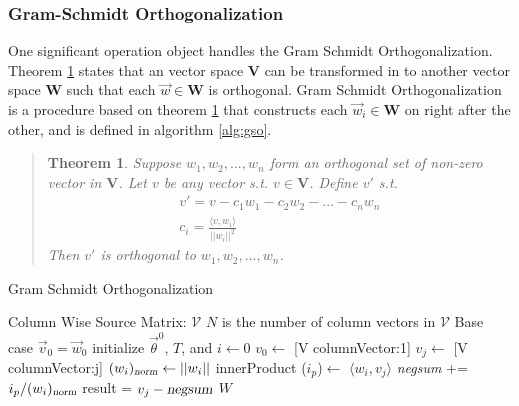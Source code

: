 \documentclass[12pt ]{article}
\newtheorem{thm}{Theorem}[section]
\begin{document}
\subsubsection{Gram-Schmidt Orthogonalization}
One significant operation object handles the Gram Schmidt Orthogonalization.  
Theorem \ref{gso-theorem} states that an vector space $\mathbf{V}$ can be transformed in to another vector space $\mathbf{W}$ such that each $\vec{w}\in \mathbf{W}$ is orthogonal.  Gram Schmidt Orthogonalization is a procedure based on theorem \ref{gso-theorem} that constructs each $\vec{w}_i \in \mathbf{W}$ on right after the other, and is defined in algorithm \ref{alg:gso}.

\begin{quote}
\begin{thm} 
\label{gso-theorem}
Suppose $w_1, w_2, ..., w_n$ form an orthogonal set of non-zero vector in $\mathbf{V}$.  Let $v$ be any vector s.t. $v \in \mathbf{V}$.  Define $v'$ s.t. 
\begin{eqnarray}
v' = v - c_1 w_1 - c_2 w_2 - ... - c_n w_n \\
c_i = \frac{\langle v , w_i \rangle} {||w_i||^2}
\end{eqnarray}
Then $v'$ is orthogonal to $w_1, w_2, ..., w_n$.
\end{thm} \cite[211]{schaums-linear-algebra}
\end{quote}


\begin{algorithm}
\caption{Gram Schmidt Orthogonalization}
\label{alg:gso}
\begin{algorithmic}
	\REQUIRE Column Wise Source Matrix: $\mathcal{V}$
	\STATE $N$ is the number of column vectors in $\mathcal{V}$
	\STATE Base case $\vec{v}_0 = \vec{w}_0$ 
	\STATE initialize $\vec{\theta}^0$, $T$, and $i \leftarrow 0$
	\STATE $v_0 \leftarrow $ [V columnVector:1]
		\STATE $v_j \leftarrow$ [V columnVector:j]
			\STATE $(w_i)_{\textsl{norm}} \leftarrow ||w_i ||$  
			\STATE innerProduct ($i_p$)$\leftarrow$ $\langle w_i , v_j \rangle$
			\STATE \textsl{negsum} += $i_p / (w_i)_{\textsl{norm}}$
		\ENDFOR
		\STATE result = $v_j - \textsl{negsum}$
	\ENDFOR
	\RETURN $W$
\end{algorithmic}
\end{algorithm}
\end{document}
